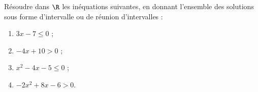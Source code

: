 \begin{exercice}
Résoudre dans $\R$ les inéquations suivantes, en donnant l'ensemble des solutions sous forme d'intervalle ou de réunion d'intervalles :
\begin{enumerate}
\item $3x - 7 \leqslant 0$ ;
\item $-4x + 10 > 0$ ;
\item $x^{2} - 4x - 5 \leqslant 0$ ;
\item $-2x^{2} + 8x - 6 > 0$.
\end{enumerate}
\end{exercice}
